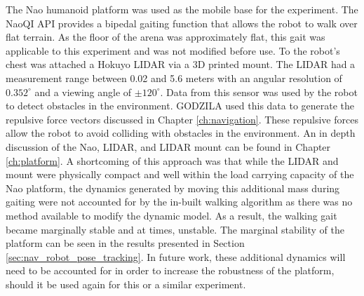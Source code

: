 The Nao humanoid platform was used as the mobile base for the experiment.
The NaoQI API provides a bipedal gaiting function that allows the robot to
walk over flat terrain. As the floor of the arena was approximately flat, this gait was
applicable to this experiment and was not modified before use.
To the robot's chest was attached a Hokuyo LIDAR via a 3D printed mount.
The LIDAR had a measurement range between 0.02 and 5.6 meters with an
angular resolution of $0.352^\circ$ and a viewing angle of $\pm 120^\circ$.
Data from this sensor was used by the robot to detect obstacles in the environment.
GODZILA used this data to generate the repulsive force vectors discussed in Chapter \ref{ch:navigation}.
These repulsive forces allow the robot to avoid colliding with obstacles in the environment.
An in depth discussion of the Nao, LIDAR, and LIDAR mount can be found in Chapter
\ref{ch:platform}.
A shortcoming of this approach was that while the LIDAR and mount were physically
compact and well within the load carrying capacity of the Nao platform, the dynamics
generated by moving this additional mass during gaiting were not accounted for by the
in-built walking algorithm as there was no method available to modify the dynamic model.
As a result, the walking gait became marginally stable and at times, unstable.
The marginal stability of the platform can be seen in the results presented in Section
\ref{sec:nav_robot_pose_tracking}.
In future work, these additional dynamics will need to be accounted for in order to
increase the robustness of the platform, should it be used again for this or a similar
experiment.


